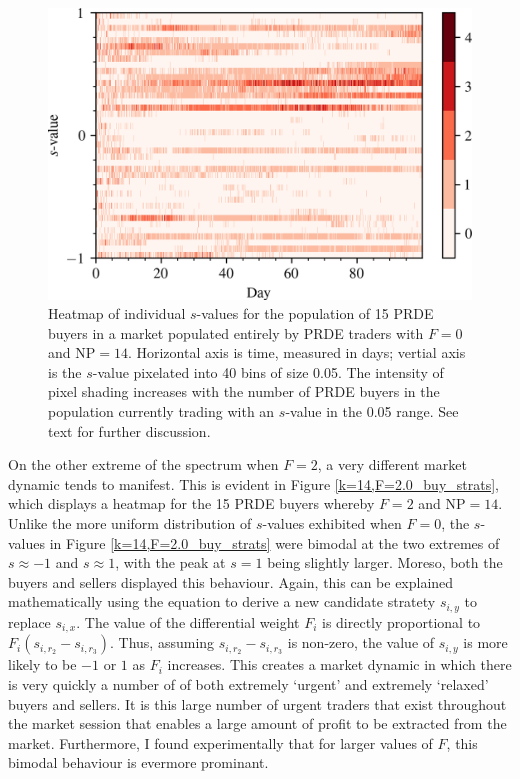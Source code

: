\documentclass[conference]{IEEEtran}
\begin{document}
\begin{figure}[htbp]
    \centerline{\includegraphics[width=\columnwidth]{k=14,F=0.0_buy_strats.png}}
    \caption{
        Heatmap of individual $s$-values for the population of 15 PRDE buyers in a market populated entirely by PRDE traders with $F=0$ and $\mathrm{NP}=14$.
        Horizontal axis is time, measured in days; vertial axis is the $s$-value pixelated into 40 bins of size 0.05.
        The intensity of pixel shading increases with the number of PRDE buyers in the population currently trading with an $s$-value in the 0.05 range.
        See text for further discussion.
    }
    \label{k=14,F=0.0_buy_strats}
\end{figure}

On the other extreme of the spectrum when $F=2$, a very different market dynamic tends to manifest.
This is evident in Figure \ref{k=14,F=2.0_buy_strats}, which displays a heatmap for the 15 PRDE buyers whereby $F=2$ and $\mathrm{NP}=14$.
Unlike the more uniform distribution of $s$-values exhibited when $F=0$, the $s$-values in Figure \ref{k=14,F=2.0_buy_strats} were bimodal at the two extremes of $s\approx-1$ and $s\approx1$, with the peak at $s=1$ being slightly larger.
Moreso, both the buyers and sellers displayed this behaviour.
Again, this can be explained mathematically using the equation to derive a new candidate stratety $s_{i,y}$ to replace $s_{i,x}$.
The value of the differential weight $F_i$ is directly proportional to $F_i(s_{i,r_2}-s_{i,r_3})$.
Thus, assuming $s_{i,r_2}-s_{i,r_3}$ is non-zero, the value of $s_{i,y}$ is more likely to be $-1$ or $1$ as $F_i$ increases.
This creates a market dynamic in which there is very quickly a number of of both extremely `urgent' and extremely `relaxed' buyers and sellers.
It is this large number of urgent traders that exist throughout the market session that enables a large amount of profit to be extracted from the market.
Furthermore, I found experimentally that for larger values of $F$, this bimodal behaviour is evermore prominant.
\end{document}

